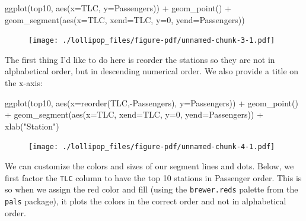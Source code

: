 \documentclass[
  letterpaper,
  DIV=11,
  numbers=noendperiod]{scrreprt}
\newenvironment{Shaded}{\begin{snugshade}}{\end{snugshade}}
\newcommand{\AttributeTok}[1]{\textcolor[rgb]{0.40,0.45,0.13}{#1}}
\newcommand{\DecValTok}[1]{\textcolor[rgb]{0.68,0.00,0.00}{#1}}
\newcommand{\FunctionTok}[1]{\textcolor[rgb]{0.28,0.35,0.67}{#1}}
\newcommand{\NormalTok}[1]{\textcolor[rgb]{0.00,0.23,0.31}{#1}}
\newcommand{\SpecialCharTok}[1]{\textcolor[rgb]{0.37,0.37,0.37}{#1}}
\newcommand{\StringTok}[1]{\textcolor[rgb]{0.13,0.47,0.30}{#1}}
\begin{document}
\begin{Shaded}
\begin{Highlighting}[]
\FunctionTok{ggplot}\NormalTok{(top10, }\FunctionTok{aes}\NormalTok{(}\AttributeTok{x=}\NormalTok{TLC, }\AttributeTok{y=}\NormalTok{Passengers)) }\SpecialCharTok{+}
  \FunctionTok{geom\_point}\NormalTok{() }\SpecialCharTok{+} 
  \FunctionTok{geom\_segment}\NormalTok{(}\FunctionTok{aes}\NormalTok{(}\AttributeTok{x=}\NormalTok{TLC, }\AttributeTok{xend=}\NormalTok{TLC, }\AttributeTok{y=}\DecValTok{0}\NormalTok{, }\AttributeTok{yend=}\NormalTok{Passengers))}
\end{Highlighting}
\end{Shaded}

\begin{figure}[H]

{\centering \texttt{[image: ./lollipop\_files/figure-pdf/unnamed-chunk-3-1.pdf]}

}

\end{figure}

The first thing I'd like to do here is reorder the stations so they are
not in alphabetical order, but in descending numerical order. We also
provide a title on the x-axis:

\begin{Shaded}
\begin{Highlighting}[]
\FunctionTok{ggplot}\NormalTok{(top10, }\FunctionTok{aes}\NormalTok{(}\AttributeTok{x=}\FunctionTok{reorder}\NormalTok{(TLC,}\SpecialCharTok{{-}}\NormalTok{Passengers), }\AttributeTok{y=}\NormalTok{Passengers)) }\SpecialCharTok{+}
  \FunctionTok{geom\_point}\NormalTok{() }\SpecialCharTok{+} 
  \FunctionTok{geom\_segment}\NormalTok{(}\FunctionTok{aes}\NormalTok{(}\AttributeTok{x=}\NormalTok{TLC, }\AttributeTok{xend=}\NormalTok{TLC, }\AttributeTok{y=}\DecValTok{0}\NormalTok{, }\AttributeTok{yend=}\NormalTok{Passengers)) }\SpecialCharTok{+}
  \FunctionTok{xlab}\NormalTok{(}\StringTok{"Station"}\NormalTok{)}
\end{Highlighting}
\end{Shaded}

\begin{figure}[H]

{\centering \texttt{[image: ./lollipop\_files/figure-pdf/unnamed-chunk-4-1.pdf]}

}

\end{figure}

We can customize the colors and sizes of our segment lines and dots.
Below, we first factor the \texttt{TLC} column to have the top 10
stations in Passenger order. This is so when we assign the red color and
fill (using the \texttt{brewer.reds} palette from the \texttt{pals}
package), it plots the colors in the correct order and not in
alphabetical order.
\end{document}
